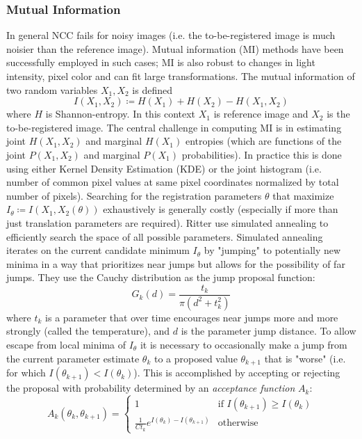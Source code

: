 \subsubsection{Mutual Information}

In general NCC fails for noisy images (i.e. the to-be-registered image is much noisier than the reference image).
%
Mutual information (MI) methods have been successfully employed in such cases; MI is also robust to changes in light intensity, pixel color and can fit large transformations.
%
The mutual information of two random variables \(X_1, X_2\) is defined
\[
	I (X_1,X_2) \coloneqq H (X_1)+H (X_2)-H (X_1,X_2)
\]
where \(H\) is Shannon-entropy.
%
In this context \(X_1\) is reference image and \(X_2\) is the to-be-registered image.
%
The central challenge in computing MI is in estimating joint \(H(X_1,X_2)\) and marginal \(H(X_1)\) entropies (which are functions of the joint \(P(X_1,X_2)\) and marginal \(P(X_1)\) probabilities).
%
In practice this is done using either Kernel Density Estimation (KDE) or the joint histogram (i.e. number of common pixel values at same pixel coordinates normalized by total number of pixels).
%
Searching for the registration parameters \(\theta\) that maximize \(I_{\theta} \coloneqq I(X_1,X_2(\theta))\) exhaustively is generally costly (especially if more than just translation parameters are required).
%
Ritter \etal\cite{ritter1999} use simulated annealing to efficiently search the space of all possible parameters.
%
Simulated annealing iterates on the current candidate minimum \(I_{\theta}\) by "jumping" to potentially new minima in a way that prioritizes near jumps but allows for the possibility of far jumps.
%
They use the Cauchy distribution as the jump proposal function:
\[
	G_k(d) = \frac{t_k}{\pi \left( d^2 + t_k^2 \right)}
\]
where \(t_k\) is a parameter that over time encourages near jumps more and more strongly (called the temperature), and \(d\) is the parameter jump distance.
%
To allow escape from local minima of \(I_{\theta}\) it is necessary to occasionally make a jump from the current parameter estimate \(\theta_k\) to a proposed value \(\theta_{k+1}\) that is "worse" (i.e. for which \(I(\theta_{k+1}) < I(\theta_{k}) \)).
%
This is accomplished by accepting or rejecting the proposal with probability determined by an \textit{acceptance function} \(A_k\):
\[
	A_k(\theta_{k}, \theta_{k+1}) = \begin{cases}
		1                                                  & \text{if } I(\theta_{k+1}) \geq I(\theta_{k}) \\
		\frac{1}{C t_k}e^{I(\theta_{k}) - I(\theta_{k+1})} & \text{otherwise}
	\end{cases}
\]

